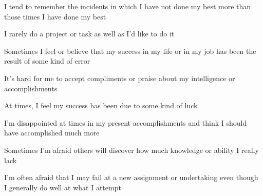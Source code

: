 \documentclass[aspectratio=169]{beamer}
\begin{document}
\begin{frame}
  \begin{center}
    \Huge I tend to remember the incidents in which I have not done my best more than those times I have done my best
  \end{center}
\end{frame}

\begin{frame}
  \begin{center}
    \Huge  I rarely do a project or task as well as I’d like to do it
  \end{center}
\end{frame}

\begin{frame}
  \begin{center}
    \Huge  Sometimes I feel or believe that my success in my life or in my job has been the result of some kind of error
  \end{center}
\end{frame}

\begin{frame}
  \begin{center}
    \Huge    It’s  hard  for  me  to  accept  compliments  or  praise  about  my  intelligence  or  accomplishments
  \end{center}
\end{frame}

\begin{frame}
  \begin{center}
    \Huge At times, I feel my success has been due to some kind of luck
  \end{center}
\end{frame}

\begin{frame}
  \begin{center}
    \Huge   I’m  disappointed  at  times  in  my  present  accomplishments  and  think  I should have accomplished much more
\end{center}
\end{frame}

\begin{frame}
  \begin{center}
    \Huge   Sometimes I’m afraid others will discover how much knowledge or ability I really lack
  \end{center}
\end{frame}

\begin{frame}
  \begin{center}
    \Huge     I’m  often  afraid  that  I  may  fail  at  a  new  assignment  or  undertaking  even  though  I  generally  do  well  at  what  I
  attempt
\end{center}
\end{frame}
\end{document}
